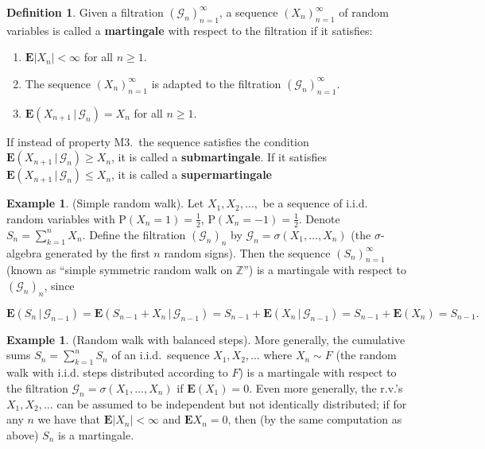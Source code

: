 \documentclass[11pt]{report}
\newcommand{\Z}{\mathbb{Z}}
\theoremstyle{plain}
\theoremstyle{definition}
\newtheorem{defn}[thm]{Definition}
\newtheorem{example}[thm]{Example}
\begin{document}
\begin{defn}
Given a filtration $(\mathcal{G}_n)_{n=1}^\infty$, a
sequence $(X_n)_{n=1}^\infty$ of random variables is
called a \textbf{martingale} with respect to the filtration
if it satisfies:

\begin{enumerate}[label=\arabic*.]
\item $\mathbf{E}|X_n|<\infty$ for all $n\ge1$.

\item The sequence $(X_n)_{n=1}^\infty$ is adapted to the
filtration $(\mathcal{G}_n)_{n=1}^\infty$.

\item $\mathbf{E}\left(X_{n+1}\,|\,\mathcal{G}_n\right) =
X_n$
for all $n\ge 1$.
\end{enumerate}

\noindent If instead of property M3.\ the sequence satisfies
the condition
$\mathbf{E}\left(X_{n+1}\,|\,\mathcal{G}_n\right) \ge
X_n$,
it is called a \textbf{submartingale}. If it satisfies
$\mathbf{E}\left(X_{n+1}\,|\,\mathcal{G}_n\right) \le
X_n$,
it is called a \textbf{supermartingale}
\end{defn}

\begin{example}
(Simple random walk). Let $X_1, X_2, \ldots,$ be a
sequence of i.i.d. random variables with
$\mathrm{P}(X_n=1)=\tfrac12$,
$\mathrm{P}(X_n=-1)=\tfrac12$. Denote
$S_n = \sum_{k=1}^n X_n$. Define the filtration
$(\mathcal{G}_n)_n$ by
$\mathcal{G}_n = \sigma(X_1,\ldots,X_n)$ (the
$\sigma$-algebra generated by the first $n$ random
signs). Then the sequence $(S_n)_{n=1}^\infty$ (known
as ``simple symmetric random walk on $\Z$'') is a
martingale with respect to $(\mathcal{G}_n)_n$, since

\[
\mathbf{E}\left(S_n\,|\,\mathcal{G}_{n-1}\right) = \mathbf{E}\left(S_{n-1}+X_n\,|\,\mathcal{G}_{n-1}\right)
= S_{n-1} + \mathbf{E}\left(X_n\,|\,\mathcal{G}_{n-1}\right) = S_{n-1} + \mathbf{E}(X_n) = S_{n-1}.
\]

\end{example}

\begin{example}
(Random walk with balanced steps). More generally,
the cumulative sums $S_n=\sum_{k=1}^n S_n$ of an
i.i.d.\ sequence $X_1,X_2,\ldots$ where $X_n\sim F$
(the random walk with i.i.d. steps distributed
according to $F$) is a martingale with respect to the
filtration $\mathcal{G}_n=\sigma(X_1,\ldots,X_n)$ if
$\mathbf{E}(X_1)=0$. Even more generally, the r.v.'s
$X_1,X_2,\ldots$ can be assumed to be independent but
not identically distributed; if for any $n$ we have
that $\mathbf{E}|X_n|<\infty$ and
$\mathbf{E} X_n = 0$, then (by the same computation
as above) $S_n$ is a martingale.
\end{example}
\end{document}
